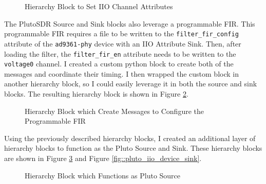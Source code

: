 \documentclass{article}
\begin{document}
\begin{figure}[H]
	\centerline{}
	\caption{Hierarchy Block to Set IIO Channel Attributes}
	\label{fig::iio_input_channel_attribute}
\end{figure}

The PlutoSDR Source and Sink blocks also leverage a programmable FIR. This programmable FIR requires a file to be written to the \texttt{filter\_fir\_config} attribute of the \texttt{ad9361-phy} device with an IIO Attribute Sink. Then, after loading the filter, the \texttt{filter\_fir\_en} attribute needs to be written to the \texttt{voltage0} channel. I created a custom python block to create both of the messages and coordinate their timing. I then wrapped the custom block in another hierarchy block, so I could easily leverage it in both the source and sink blocks. The resulting hierarchy block is shown in Figure \ref{fig::iio_fir_config}.

\begin{figure}[H]
	\centerline{}
	\caption{Hierarchy Block which Create Messages  to Configure the Programmable FIR}
	\label{fig::iio_fir_config}
\end{figure}

Using the previously described hierarchy blocks, I created an additional layer of hierarchy blocks to function as the Pluto Source and Sink. These hierarchy blocks are shown in Figure \ref{fig::pluto_iio_device_source} and Figure \ref{fig::pluto_iio_device_sink}.

\begin{figure}[H]
	\centerline{}
	\caption{Hierarchy Block which Functions as Pluto Source}
	\label{fig::pluto_iio_device_source}
\end{figure}
\end{document}
